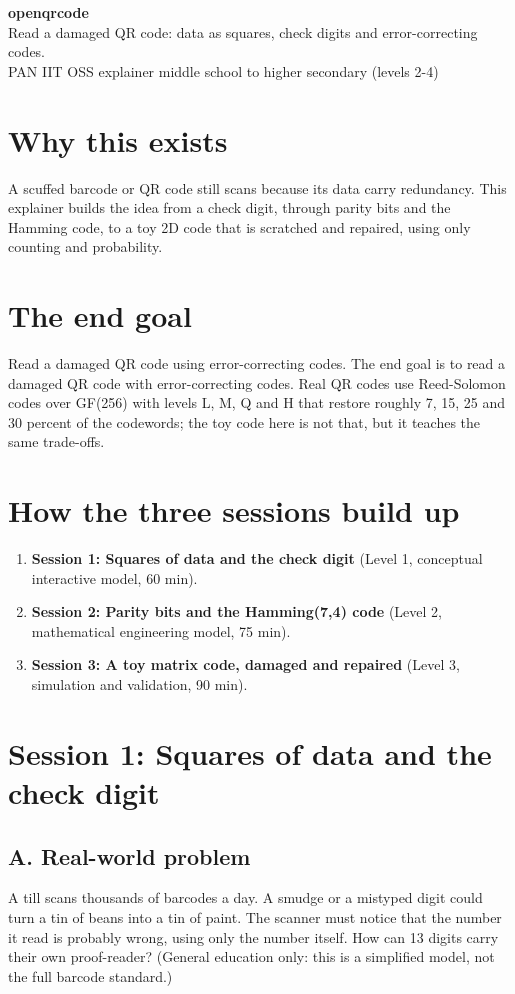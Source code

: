 \documentclass[11pt,a4paper]{article}
\begin{document}
\begin{center}{\LARGE\bfseries openqrcode}\\[0.4em]{\large Read a damaged QR code: data as squares, check digits and error-correcting codes.}\\[0.2em]\small PAN IIT OSS explainer \textbullet{} middle school to higher secondary (levels 2-4)\end{center}

\section*{Why this exists}
A scuffed barcode or QR code still scans because its data carry redundancy. This explainer builds the idea from a check digit, through parity bits and the Hamming code, to a toy 2D code that is scratched and repaired, using only counting and probability.

\section*{The end goal}
Read a damaged QR code using error-correcting codes. The end goal is to read a damaged QR code with error-correcting codes. Real QR codes use Reed-Solomon codes over GF(256) with levels L, M, Q and H that restore roughly 7, 15, 25 and 30 percent of the codewords; the toy code here is not that, but it teaches the same trade-offs.

\section*{How the three sessions build up}
\begin{enumerate}[nosep]
\item \textbf{Session 1: Squares of data and the check digit} (Level 1, conceptual interactive model, 60 min).
\item \textbf{Session 2: Parity bits and the Hamming(7,4) code} (Level 2, mathematical engineering model, 75 min).
\item \textbf{Session 3: A toy matrix code, damaged and repaired} (Level 3, simulation and validation, 90 min).
\end{enumerate}

\section{Session 1: Squares of data and the check digit}

\subsection*{A. Real-world problem}
A till scans thousands of barcodes a day. A smudge or a mistyped digit could turn a tin of beans into a tin of paint. The scanner must notice that the number it read is probably wrong, using only the number itself. How can 13 digits carry their own proof-reader? (General education only: this is a simplified model, not the full barcode standard.)
\end{document}
